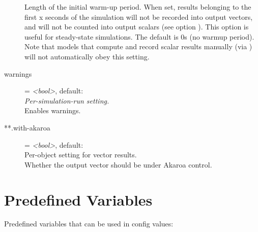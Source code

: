 \begin{description}
    Length of the initial warm-up period. When set, results belonging to the
    first x seconds of the simulation will not be recorded into output vectors,
    and will not be counted into output scalars (see option
    ).
    This option is useful for steady-state simulations. The default is 0s (no
    warmup period). Note that models that compute and record scalar results
    manually (via ) will not automatically obey this
    setting.
\item[warnings] = \textit{<bool>}, default: \\
    \textit{Per-simulation-run setting.}\\
    Enables warnings.
\item[**.with-akaroa] = \textit{<bool>}, default: \\
    Per-object setting for vector results.\\
    Whether the output vector should be under Akaroa control.
\end{description}

\section{Predefined Variables}
\label{sec:config-options:predefined-variables}

Predefined variables that can be used in config values:

